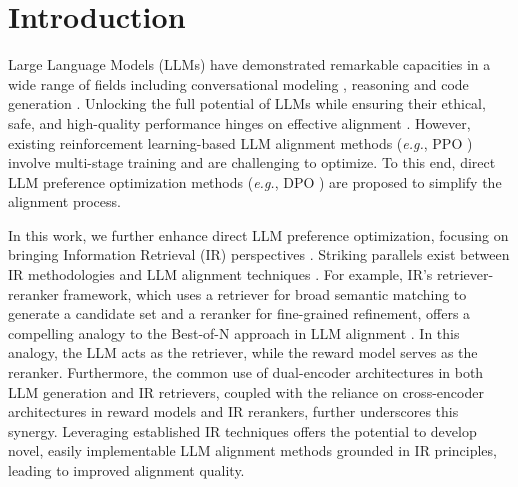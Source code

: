 
\section{Introduction}
Large Language Models (LLMs) \citep{achiam2023gpt,team2024gemini} have demonstrated remarkable capacities in a wide range of fields including conversational modeling \citep{zhao2023survey}, reasoning \citep{wei2022chain} and code generation \citep{jiang2024survey}.  
Unlocking the full potential of LLMs while ensuring their ethical, safe, and high-quality performance hinges on effective alignment \citep{wang2023aligning}. 
However, existing reinforcement learning-based LLM alignment methods (\textit{e.g.}, PPO \citep{ouyang2022training}) involve multi-stage training and are challenging to optimize.
To this end, direct LLM preference optimization methods (\textit{e.g.}, DPO \citep{rafailov2024direct}) are proposed to simplify the alignment process.

In this work, we further enhance direct LLM preference optimization, focusing on bringing Information Retrieval (IR) perspectives \citep{tay2022transformer}.
Striking parallels exist between IR methodologies and LLM alignment techniques \citep{lin2022pretrained}. 
For example, IR's retriever-reranker framework, which uses a retriever for broad semantic matching to generate a candidate set and a reranker for fine-grained refinement, offers a compelling analogy to the Best-of-N approach in LLM alignment \citep{dong2023raft, sessa2024bond}. 
In this analogy, the LLM acts as the retriever, while the reward model serves as the reranker.
Furthermore, the common use of dual-encoder architectures in both LLM generation and IR retrievers, coupled with the reliance on cross-encoder architectures in reward models and IR rerankers, further underscores this synergy.  
Leveraging established IR techniques offers the potential to develop novel, easily implementable LLM alignment methods grounded in IR principles, leading to improved alignment quality.


